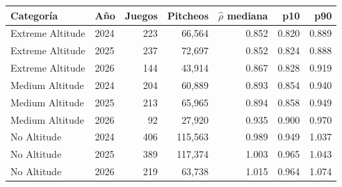 \begin{tabular}{llrrrrr}
\toprule
Categoría & Año & Juegos & Pitcheos & $\hat\rho$ mediana & p10 & p90 \\
\midrule
Extreme Altitude & 2024 & 223 & 66,564 & 0.852 & 0.820 & 0.889 \\
Extreme Altitude & 2025 & 237 & 72,697 & 0.852 & 0.824 & 0.888 \\
Extreme Altitude & 2026 & 144 & 43,914 & 0.867 & 0.828 & 0.919 \\
\midrule
Medium Altitude & 2024 & 204 & 60,889 & 0.893 & 0.854 & 0.940 \\
Medium Altitude & 2025 & 213 & 65,965 & 0.894 & 0.858 & 0.949 \\
Medium Altitude & 2026 & 92 & 27,920 & 0.935 & 0.900 & 0.970 \\
\midrule
No Altitude & 2024 & 406 & 115,563 & 0.989 & 0.949 & 1.037 \\
No Altitude & 2025 & 389 & 117,374 & 1.003 & 0.965 & 1.043 \\
No Altitude & 2026 & 219 & 63,738 & 1.015 & 0.964 & 1.074 \\
\bottomrule
\end{tabular}

